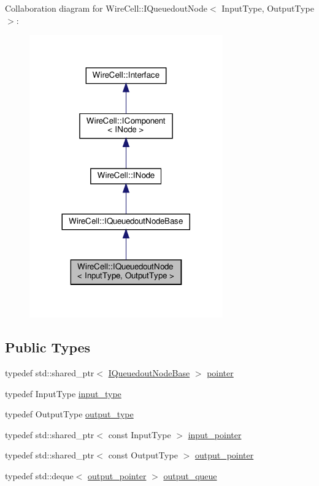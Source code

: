 Collaboration diagram for Wire\+Cell\+:\+:I\+Queuedout\+Node$<$ Input\+Type, Output\+Type $>$\+:
\nopagebreak
\begin{figure}[H]
\begin{center}
\leavevmode
\includegraphics[width=236pt]{class_wire_cell_1_1_i_queuedout_node__coll__graph}
\end{center}
\end{figure}
\subsection*{Public Types}
\begin{DoxyCompactItemize}
\item 
typedef std\+::shared\+\_\+ptr$<$ \hyperlink{class_wire_cell_1_1_i_queuedout_node_base}{I\+Queuedout\+Node\+Base} $>$ \hyperlink{class_wire_cell_1_1_i_queuedout_node_aa286ccabc249c4b3c41be71862bbe024}{pointer}
\item 
typedef Input\+Type \hyperlink{class_wire_cell_1_1_i_queuedout_node_aa0501633b9a10015ab9f84852e045e30}{input\+\_\+type}
\item 
typedef Output\+Type \hyperlink{class_wire_cell_1_1_i_queuedout_node_a73c4920dd90460bd4f0ef9beb61d6091}{output\+\_\+type}
\item 
typedef std\+::shared\+\_\+ptr$<$ const Input\+Type $>$ \hyperlink{class_wire_cell_1_1_i_queuedout_node_acf5f716a764553f3c7055a9cf67e906e}{input\+\_\+pointer}
\item 
typedef std\+::shared\+\_\+ptr$<$ const Output\+Type $>$ \hyperlink{class_wire_cell_1_1_i_queuedout_node_ae0907b2315773a3aba69764795d9811a}{output\+\_\+pointer}
\item 
typedef std\+::deque$<$ \hyperlink{class_wire_cell_1_1_i_queuedout_node_ae0907b2315773a3aba69764795d9811a}{output\+\_\+pointer} $>$ \hyperlink{class_wire_cell_1_1_i_queuedout_node_a39018e4e3dd886befac9636ac791a685}{output\+\_\+queue}
\end{DoxyCompactItemize}
